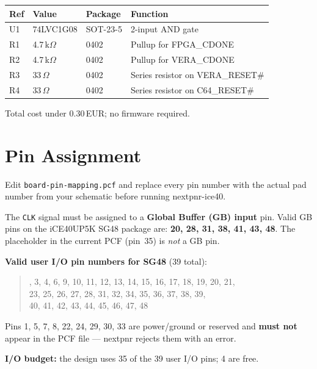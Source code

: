 \documentclass[11pt,a4paper]{article}
\newcommand{\sig}[1]{\texttt{#1}}
\newcommand{\file}[1]{\texttt{#1}}
\begin{document}
\begin{center}
\begin{tabular}{lllp{4.5cm}}
\toprule
\textbf{Ref} & \textbf{Value} & \textbf{Package} & \textbf{Function} \\
\midrule
U1  & 74LVC1G08      & SOT-23-5 & 2-input AND gate \\
R1  & 4.7\,k$\Omega$ & 0402     & Pullup for FPGA\_CDONE \\
R2  & 4.7\,k$\Omega$ & 0402     & Pullup for VERA\_CDONE \\
R3  & 33\,$\Omega$   & 0402     & Series resistor on VERA\_RESET\# \\
R4  & 33\,$\Omega$   & 0402     & Series resistor on C64\_RESET\# \\
\bottomrule
\end{tabular}
\end{center}

Total cost under 0.30\,EUR; no firmware required.

\section{Pin Assignment}
\label{sec:pins}

Edit \file{board-pin-mapping.pcf} and replace every pin number with the
actual pad number from your schematic before running nextpnr-ice40.

The \sig{CLK} signal must be assigned to a \textbf{Global Buffer (GB)
input} pin.  Valid GB pins on the iCE40UP5K SG48 package are:
\textbf{20, 28, 31, 38, 41, 43, 48}.  The placeholder in the current PCF
(pin~35) is \emph{not} a GB pin.

\textbf{Valid user I/O pin numbers for SG48} (39 total):
\begin{quote}, 3, 4, 6, 9, 10, 11, 12, 13, 14, 15, 16, 17, 18, 19, 20, 21,\\
23, 25, 26, 27, 28, 31, 32, 34, 35, 36, 37, 38, 39,\\
40, 41, 42, 43, 44, 45, 46, 47, 48
\end{quote}
Pins 1, 5, 7, 8, 22, 24, 29, 30, 33 are power/ground or reserved and
\textbf{must not} appear in the PCF file --- nextpnr rejects them with an
error.

\textbf{I/O budget:} the design uses 35 of the 39 user I/O pins; 4 are
free.
\end{document}

